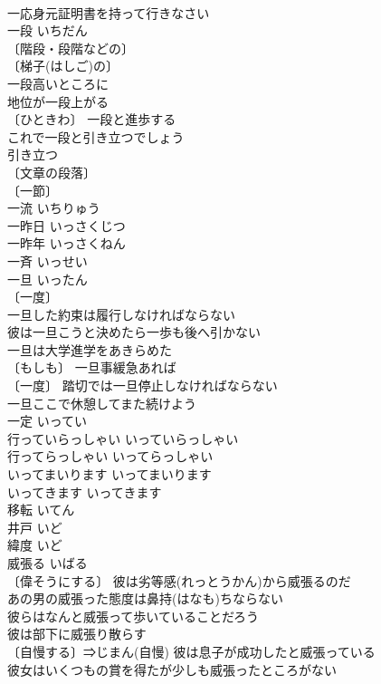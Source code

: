 \documentclass[8pt]{extreport}
\begin{document}
\begin{CJK}{UTF8}{min}
\\	一応身元証明書を持って行きなさい 
\\	一段	いちだん	
\\	〔階段・段階などの〕
\\	〔梯子(はしご)の〕
\\	一段高いところに 
\\	地位が一段上がる 
\\	〔ひときわ〕 一段と進歩する 
\\	これで一段と引き立つでしょう 
\\	引き立つ 
\\	〔文章の段落〕
\\	〔一節〕
\\	一流	いちりゅう	
\\	一昨日	いっさくじつ	
\\	一昨年	いっさくねん	
\\	一斉	いっせい	
\\	一旦	いったん	
\\	〔一度〕
\\	一旦した約束は履行しなければならない 
\\	彼は一旦こうと決めたら一歩も後へ引かない 
\\	一旦は大学進学をあきらめた 
\\	〔もしも〕 一旦事緩急あれば 
\\	〔一度〕 踏切では一旦停止しなければならない 
\\	一旦ここで休憩してまた続けよう 
\\	一定	いってい	
\\	行っていらっしゃい	いっていらっしゃい	
\\	行ってらっしゃい	いってらっしゃい	
\\	いってまいります	いってまいります	
\\	いってきます	いってきます	
\\	移転	いてん	
\\	井戸	いど	
\\	緯度	いど	
\\	威張る	いばる	
\\	〔偉そうにする〕 彼は劣等感(れっとうかん)から威張るのだ 
\\	あの男の威張った態度は鼻持(はなも)ちならない 
\\	彼らはなんと威張って歩いていることだろう 
\\	彼は部下に威張り散らす 
\\	〔自慢する〕⇒じまん(自慢) 彼は息子が成功したと威張っている 
\\	彼女はいくつもの賞を得たが少しも威張ったところがない 

\end{CJK}
\end{document}
